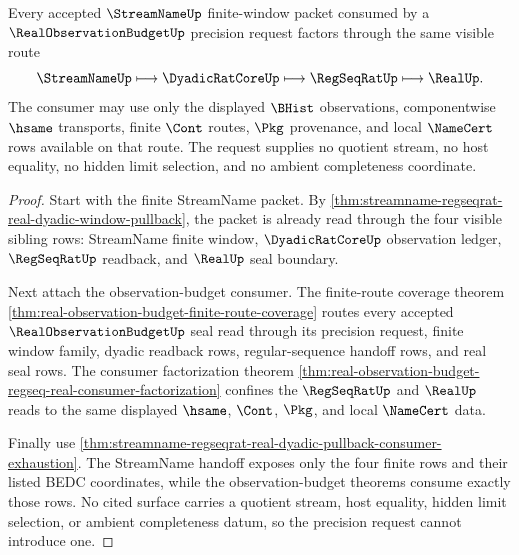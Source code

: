 \begin{theorem}
\label{thm:streamname-real-observation-budget-factorization}
Every accepted $\StreamNameUp$ finite-window packet consumed by a
$\RealObservationBudgetUp$ precision request factors through the same visible
route
$$
\StreamNameUp \longmapsto \DyadicRatCoreUp \longmapsto \RegSeqRatUp \longmapsto \RealUp.
$$
The consumer may use only the displayed $\BHist$ observations, componentwise
$\hsame$ transports, finite $\Cont$ routes, $\Pkg$ provenance, and local
$\NameCert$ rows available on that route. The request supplies no quotient
stream, no host equality, no hidden limit selection, and no ambient
completeness coordinate.
\end{theorem}
\begin{proof}
Start with the finite StreamName packet. By
\autoref{thm:streamname-regseqrat-real-dyadic-window-pullback}, the packet is
already read through the four visible sibling rows: StreamName finite window,
$\DyadicRatCoreUp$ observation ledger, $\RegSeqRatUp$ readback, and $\RealUp$
seal boundary.

Next attach the observation-budget consumer. The finite-route coverage theorem
\autoref{thm:real-observation-budget-finite-route-coverage} routes every
accepted $\RealObservationBudgetUp$ seal read through its precision request,
finite window family, dyadic readback rows, regular-sequence handoff rows, and
real seal rows. The consumer factorization theorem
\autoref{thm:real-observation-budget-regseq-real-consumer-factorization}
confines the $\RegSeqRatUp$ and $\RealUp$ reads to the same displayed
$\hsame$, $\Cont$, $\Pkg$, and local $\NameCert$ data.

Finally use
\autoref{thm:streamname-regseqrat-real-dyadic-pullback-consumer-exhaustion}.
The StreamName handoff exposes only the four finite rows and their listed BEDC
coordinates, while the observation-budget theorems consume exactly those rows.
No cited surface carries a quotient stream, host equality, hidden limit
selection, or ambient completeness datum, so the precision request cannot
introduce one.
\end{proof}

